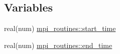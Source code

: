\subsection*{Variables}
\begin{DoxyCompactItemize}
\item 
real(num) \hyperlink{namespacempi__routines_aa3f567f6443fe088b81d3fb43509a45c}{mpi\+\_\+routines\+::start\+\_\+time}
\item 
real(num) \hyperlink{namespacempi__routines_a4b0b516f93006e24d942b3f124cb82d4}{mpi\+\_\+routines\+::end\+\_\+time}
\end{DoxyCompactItemize}
